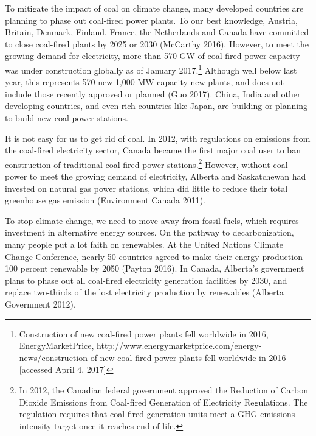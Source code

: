 \documentclass[10pt,letter]{article}
\begin{document}
To mitigate the impact of coal on climate change, many developed
countries are planning to phase out coal-fired power plants. To our best
knowledge, Austria, Britain, Denmark, Finland, France, the Netherlands
and Canada have committed to close coal-fired plants by 2025 or 2030
(McCarthy 2016). However, to meet the growing demand for electricity,
more than 570 GW of coal-fired power capacity was under construction
globally as of January 2017.\footnote{Construction of new coal-fired
  power plants fell worldwide in 2016, EnergyMarketPrice,
  \url{http://www.energymarketprice.com/energy-news/construction-of-new-coal-fired-power-plants-fell-worldwide-in-2016}
  {[}accessed April 4, 2017{]}} Although well below last year, this
represents 570 new 1,000 MW capacity new plants, and does not include
those recently approved or planned (Guo 2017). China, India and other
developing countries, and even rich countries like Japan, are building
or planning to build new coal power stations.

It is not easy for us to get rid of coal. In 2012, with regulations on
emissions from the coal-fired electricity sector, Canada became the
first major coal user to ban construction of traditional coal-fired
power stations.\footnote{In 2012, the Canadian federal government
  approved the Reduction of Carbon Dioxide Emissions from Coal-fired
  Generation of Electricity Regulations. The regulation requires that
  coal-fired generation units meet a GHG emissions intensity target once
  it reaches end of life.} However, without coal power to meet the
growing demand of electricity, Alberta and Saskatchewan had invested on
natural gas power stations, which did little to reduce their total
greenhouse gas emission (Environment Canada 2011).

To stop climate change, we need to move away from fossil fuels, which
requires investment in alternative energy sources. On the pathway to
decarbonization, many people put a lot faith on renewables. At the
United Nations Climate Change Conference, nearly 50 countries agreed to
make their energy production 100 percent renewable by 2050 (Payton
2016). In Canada, Alberta's government plans to phase out all coal-fired
electricity generation facilities by 2030, and replace two-thirds of the
lost electricity production by renewables (Alberta Government 2012).
\end{document}

